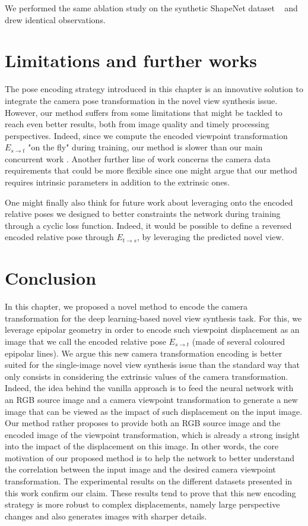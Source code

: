We performed the same ablation study on the synthetic ShapeNet dataset ~\cite{chang2015shapenet} and drew identical observations.

\section{Limitations and further works}
The pose encoding strategy introduced in this chapter is an innovative solution to integrate the camera pose transformation in the novel view synthesis issue. However, our method suffers from some limitations that might be tackled to reach even better results, both from image quality and timely processing perspectives. Indeed, since we compute the encoded viewpoint transformation $E_{s\xrightarrow{}t}$ "on the fly" during training, our method is slower than our main concurrent work \citep{kim2020novel}. Another further line of work concerns the camera data requirements that could be more flexible since one might argue that our method requires intrinsic parameters in addition to the extrinsic ones. 

One might finally also think for future work about leveraging onto the encoded relative poses we designed to better constraints the network during training through a cyclic loss function. Indeed, it would be possible to define a reversed encoded relative pose through $E_{t\xrightarrow{}s}$, by leveraging the predicted novel view. 

\section{Conclusion}
In this chapter, we proposed a novel method to encode the camera transformation for the deep learning-based novel view synthesis task. For this, we leverage epipolar geometry in order to encode such viewpoint displacement as an image that we call the encoded relative pose $E_{s\xrightarrow{}t}$ (made of several coloured epipolar lines). We argue this new camera transformation encoding is better suited for the single-image novel view synthesis issue than the standard way that only consists in considering the extrinsic values of the camera transformation. Indeed, the idea behind the vanilla approach is to feed the neural network with an RGB source image and a camera viewpoint transformation to generate a new image that can be viewed as the impact of such displacement on the input image. Our method rather proposes to provide both an RGB source image and the encoded image of the viewpoint transformation, which is already a strong insight into the impact of the displacement on this image. In other words, the core motivation of our proposed method is to help the network to better understand the correlation between the input image and the desired camera viewpoint transformation. The experimental results on the different datasets presented in this work confirm our claim. These results tend to prove that this new encoding strategy is more robust to complex displacements, namely large perspective changes and also generates images with sharper details. 